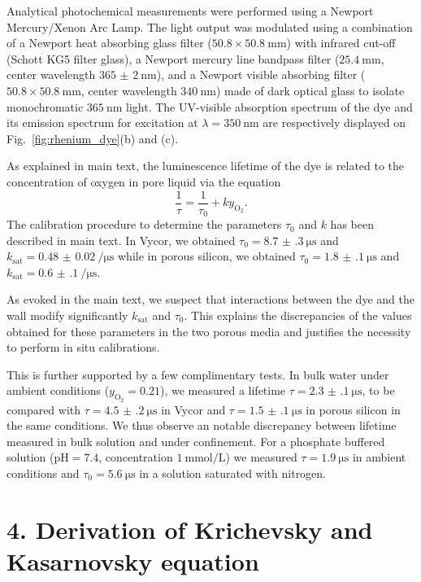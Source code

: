 \documentclass[aps,prl,twocolumn,superscriptaddress,groupedaddress]{revtex4}
\begin{document}
Analytical photochemical measurements were performed using a Newport Mercury/Xenon Arc Lamp. The light output was modulated using a combination of a Newport heat absorbing glass filter ($50.8 \times \SI{50.8}{\milli\meter}$) with infrared cut-off (Schott KG5 filter glass), a Newport mercury line bandpass filter ($\SI{25.4}{\milli\meter}$, center wavelength $\SI{365(2)}{\nano\meter}$), and a Newport visible absorbing filter ($50.8 \times \SI{50.8}{\milli\meter}$, center wavelength $\SI{340}{\nano\meter}$) made of dark optical glass to isolate monochromatic $\SI{365}{\nano\meter}$ light. The UV-visible absorption spectrum of the dye and its emission spectrum for excitation at $\lambda=\SI{350}{\nano\meter}$ are respectively displayed on Fig.~\ref{fig:rhenium_dye}(b) and (c).

As explained in main text, the luminescence lifetime of the dye is related to the concentration of oxygen in pore liquid via the equation
\begin{equation}
\frac{1}{\tau} = \frac{1}{\tau_0} + k y_\mathrm{O_2}.
\label{eq:stern_volmer_gas_2}
\end{equation}
\noindent The calibration procedure to determine the parameters $\tau_0$ and $k$ has been described in main text. In Vycor, we obtained $\tau_0=\SI{8.7(3)}{\micro\second}$ and $k_\text{sat}=\SI{0.48(2)}{\per\micro\second}$ while in porous silicon, we obtained  $\tau_0=\SI{1.8(1)}{\micro\second}$ and $k_\text{sat}=\SI{0.6(1)}{\per\micro\second}$.

As evoked in the main text, we suspect that interactions between the dye and the wall modify significantly $k_\text{sat}$ and $\tau_0$. This explains the discrepancies of the values obtained for these parameters in the two porous media and justifies the necessity to perform in situ calibrations. 

This is further supported by a few complimentary tests. In bulk water under ambient conditions ($y_\mathrm{O_2}=0.21$), we measured a lifetime $\tau=\SI{2.3(1)}{\micro\second}$, to be compared with  $\tau=\SI{4.5(2)}{\micro\second}$ in Vycor and $\tau=\SI{1.5(1)}{\micro\second}$ in porous silicon in the same conditions. We thus observe an notable discrepancy between lifetime measured in bulk solution and under confinement. For a phosphate buffered solution ($\mathrm{pH}=7.4$, concentration $\SI{1}{\milli\mole\per\liter}$) we measured $\tau=\SI{1.9}{\micro\second}$ in ambient conditions and $\tau_0=\SI{5.6}{\micro\second}$ in a solution saturated with nitrogen.

\section*{4. Derivation of Krichevsky and Kasarnovsky equation}
\end{document}
